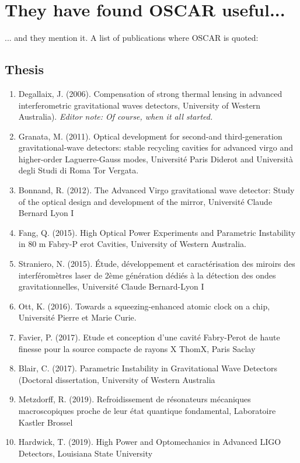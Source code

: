 \chapter{They have found OSCAR useful...}
... and they mention it. A list of publications where OSCAR is quoted:

\section{Thesis}

\begin{enumerate}

\item Degallaix, J. (2006). Compensation of strong thermal lensing in advanced interferometric gravitational waves detectors, University of Western Australia). \emph{Editor note: Of course, when it all started.}

\item Granata, M. (2011). Optical development for second-and third-generation gravitational-wave detectors: stable recycling cavities for advanced virgo and higher-order Laguerre-Gauss modes, Université Paris Diderot and Università degli Studi di Roma Tor Vergata.

\item Bonnand, R. (2012). The Advanced Virgo gravitational wave detector: Study of the optical design and development of the mirror, Université Claude Bernard Lyon I

\item Fang, Q. (2015). High Optical Power Experiments and Parametric Instability in 80 m Fabry-P erot Cavities, University of Western Australia.

\item Straniero, N. (2015). Étude, développement et caractérisation des miroirs des interféromètres laser de 2ème génération dédiés à la détection des ondes gravitationnelles, Université Claude Bernard-Lyon I

\item Ott, K. (2016). Towards a squeezing-enhanced atomic clock on a chip, Université Pierre et Marie Curie.

\item Favier, P. (2017). Etude et conception d'une cavité Fabry-Perot de haute finesse pour la source compacte de rayons X ThomX, Paris Saclay

\item Blair, C. (2017). Parametric Instability in Gravitational Wave Detectors (Doctoral dissertation, University of Western Australia

\item Metzdorff, R. (2019). Refroidissement de résonateurs mécaniques macroscopiques proche de leur état quantique fondamental, Laboratoire Kastler Brossel

\item Hardwick, T. (2019). High Power and Optomechanics in Advanced LIGO Detectors, Louisiana State University
\end{enumerate}


